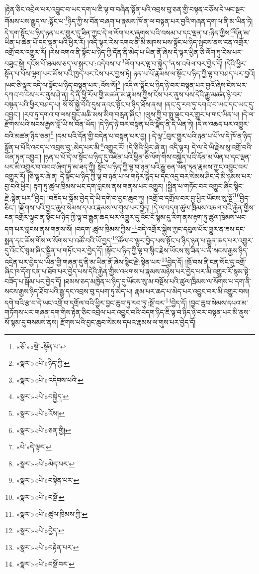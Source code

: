 །རྟེན་ཅིང་འབྲེལ་པར་འབྱུང་བ་ཡང་དག་པ་ཇི་ལྟ་བ་བཞིན་སྟོན་པའི་འབྲས་བུ་ཅན་གྱི་བསྟན་བཅོས་དེ་ཡང་སྔར་གོམས་པས་རྒྱུད་ལ་:སྟོང་པ་\footnote{«ཅོ་»«སྡེ་»སྟོན་པ་}ཉིད་ཀྱི་ས་བོན་བཞག་པ་རྣམས་ཁོ་ན་ལ་བསྟན་པར་བྱའི་གཞན་དག་ལ་ནི་མ་ཡིན་ཏེ། དེ་དག་སྟོང་པ་ཉིད་ཉན་པར་གྱུར་དུ་ཟིན་ཀྱང་དེ་ལ་ལོག་པར་ཞུགས་པའི་བསམ་པ་དང་ལྡན་པ་:ཉིད་ཀྱིས་\footnote{«སྣར་»«པེ་»ཉིད་ཀྱི་}དོན་མ་ཡིན་པ་ཆེན་པོ་དང་ལྡན་པའི་ཕྱིར་རོ། །འདི་ལྟར་རེས་འགའ་ནི་མི་མཁས་པས་སྟོང་པ་ཉིད་སྤངས་ནས་ངན་འགྲོར་འགྲོ་བར་འགྱུར་རོ། །རེས་འགའ་ནི་སྟོང་པ་ཉིད་ཀྱི་དོན་ནི་མེད་པ་ཡིན་ནོ་ཞེས་དེ་ལྟར་ཕྱིན་ཅི་ལོག་ཏུ་ངེས་པར་བཟུང་སྟེ། དངོས་པོ་ཐམས་ཅད་ལ་སྐུར་པ་:འདེབས་པ་\footnote{«སྣར་»«པེ་»འདེབས་པའི་}ལོག་པར་ལྟ་བ་སྐྱེད་\footnote{«སྣར་»«པེ་»བསྐྱེད་}ནས་འཕེལ་བར་བྱེད་དོ། །དེའི་ཕྱིར་སྟོན་པ་པོས་ལྷག་པར་མོས་པའི་ཁྱད་པར་ངེས་པར་བྱས་ཏེ། ཉན་པ་པོ་རྣམས་ལ་སྟོང་པ་ཉིད་ཀྱི་ལྟ་བ་བཤད་པར་བྱའོ། །ཡང་ཅི་ལྟར་འདི་ལ་སྟོང་པ་ཉིད་བསྟན་པར་:འོས་སོ།\footnote{«སྣར་»«པེ་»འོས།} །འདི་ལ་སྟོང་པ་ཉིད་ཉེ་བར་བསྟན་པར་བྱའོ་ཞེས་ངེས་པར་དཀའ་བ་ངེས་པར་ནུས་ཤེ་ན། དེ་ནི་ཕྱི་རོལ་གྱི་མཚན་མ་རྣམས་ཀྱིས་ངེས་པར་ནུས་པས་དེའི་རྒྱུ་མཚན་ཉེ་བར་བསྟན་པའི་ཕྱིར་བཤད་པ། སོ་སོ་སྐྱེ་བོའི་དུས་ནའང་སྟོང་པ་ཉིད་ཐོས་ནས། །ནང་དུ་རབ་ཏུ་དགའ་བ་ཡང་དང་ཡང་དུ་འབྱུང་། །རབ་ཏུ་དགའ་བ་ལས་བྱུང་མཆི་མས་མིག་བརླན་ཞིང་། །ལུས་ཀྱི་བ་སྤུ་ལྡང་བར་གྱུར་པ་གང་ཡིན་པ། །དེ་ལ་རྫོགས་པའི་སངས་རྒྱས་བློ་ཡི་ས་བོན་ཡོད། །དེ་ཉིད་ཉེ་བར་བསྟན་པའི་སྣོད་ནི་དེ་ཡིན་ཏེ། །དེ་ལ་འཆད་པར་འགྱུར་བའི་མཚན་ཉིད་ཅན།\footnote{«སྣར་»«པེ་»ཅན་གྱི།} །དམ་པའི་དོན་གྱི་བདེན་པ་བསྟན་པར་བྱ། །:དེ་ལྟ་\footnote{«པེ་»དེ་ལྟར་}བུར་གྱུར་པའི་ཉན་པ་པོ་ལ་དེ་ཁོ་ན་ཉིད་སྟོན་པ་པོའི་འབད་པ་འབྲས་བུ་:མེད་པར་མི་\footnote{«སྣར་»«པེ་»མེད་པར་}འགྱུར་རོ། །དེ་ཅིའི་ཕྱིར་ཞེ་ན། འདི་ལྟར། དེ་ལ་དེ་ཡི་རྗེས་སུ་འགྲོ་བའི་ཡོན་ཏན་འབྱུང་། །ཉན་པ་པོ་དེ་ལ་སྟོང་པ་ཉིད་དུ་འཛིན་པའི་ཕྱིན་ཅི་ལོག་གིས་བསྐྱེད་པའི་དོན་མ་ཡིན་པ་དང་ལྡན་པར་མི་འགྱུར་བ་འབའ་ཞིག་ཏུ་མ་ཟད་ཀྱི། སྟོང་པ་ཉིད་ཀྱི་ལྟ་བ་ཉན་པའི་རྒྱུ་ཅན་ཡོན་ཏན་རྣམས་ཀྱང་འབྱུང་བར་འགྱུར་རོ། །ཅི་ལྟར་ཞེ་ན། དེ་སྟོང་པ་ཉིད་ཀྱི་ལྟ་བ་ཉན་པ་ལ་གཏེར་རྙེད་པ་དང་འདྲ་བར་སེམས་ཤིང་དེ་མི་ཉམས་པར་བྱ་བའི་ཕྱིར། རྟག་ཏུ་ཚུལ་ཁྲིམས་ཡང་དག་བླངས་ནས་གནས་པར་འགྱུར། །སྦྱིན་པ་གཏོང་བར་འགྱུར་ཞིང་སྙིང་རྗེ་:སྟེན་པར་\footnote{«སྣར་»«པེ་»བསྟེན་པར་}བྱེད། །བཟོད་པ་སྒོམ་བྱེད་དེ་ཡི་དགེ་བ་བྱང་ཆུབ་ཏུ། །འགྲོ་བ་དགྲོལ་བར་བྱ་ཕྱིར་ཡོངས་སུ་སྔོ་\footnote{«སྣར་»«པེ་»བསྔོ་}བྱེད་ཅིང་། །རྫོགས་པའི་བྱང་ཆུབ་སེམས་དཔའ་རྣམས་ལ་གུས་པར་བྱེད། །དེ་ལ་བདག་ཚུལ་ཁྲིམས་འཆལ་བའི་རྐྱེན་གྱིས་ངན་འགྲོར་ལྟུང་ན་སྟོང་པ་ཉིད་ཀྱི་ལྟ་བ་རྒྱུན་ཆད་པར་འགྱུར་དུ་འོང་ངོ་སྙམ་དུ་རིག་ནས་རྟག་ཏུ་ཚུལ་ཁྲིམས་ཡང་དག་པར་བླངས་ནས་གནས་སོ། །བདག་:ཚུལ་ཁྲིམས་ཀྱིས་\footnote{«སྣར་»«པེ་»ཚུལ་ཁྲིམས་ཀྱི་}བདེ་འགྲོར་སྐྱེས་ཀྱང་དབུལ་པོར་གྱུར་ན་ཟས་དང་སྨན་དང་ཆོས་གོས་ལ་སོགས་པ་འཚོ་བའི་ཡོ་བྱད་\footnote{«སྣར་»«པེ་»བྱེད་}ཚོལ་བ་ལྷུར་བྱེད་པས་སྟོང་པ་ཉིད་ཉན་པ་རྒྱུན་ཆད་པར་འགྱུར་དུ་འོང་ངོ་སྙམ་ཞིང་སྦྱིན་པ་གཏོང་བར་བྱེད་དོ། །སྟོང་པ་ཉིད་ཀྱི་ལྟ་བ་སྙིང་རྗེས་ཡོངས་སུ་ཟིན་པ་ནི་སངས་རྒྱས་ཉིད་འདྲེན་པར་བྱེད་པ་ཡིན་གྱི་གཞན་དུ་ནི་མ་ཡིན་ནོ་ཞེས་སྙིང་རྗེ་:སྟེན་པར་\footnote{«སྣར་»«པེ་»བརྟེན་པར་}བྱེད་དོ། །ཁྲོ་བས་ནི་ངན་སོང་དུ་འགྲོ་ཞིང་ཁ་དོག་ངན་པ་ཐོབ་པར་བྱེད་པས་དེའི་རྐྱེན་གྱིས་འཕགས་པ་རྣམས་མཉེས་པར་བྱེད་པར་མི་འགྱུར་རོ་སྙམ་སྟེ་བཟོད་པ་སྒོམ་པར་བྱེད་དོ། །ཐམས་ཅད་མཁྱེན་པ་ཉིད་དུ་ཡོངས་སུ་མ་བསྔོས་པའི་ཚུལ་ཁྲིམས་ལ་སོགས་པ་དག་ནི་སངས་རྒྱས་ཉིད་ཐོབ་པའི་རྒྱུ་དང་འབྲས་བུ་དཔག་ཏུ་མེད་པ། རྣམ་པར་ཆད་པ་མེད་པར་འབྱུང་བར་མི་འགྱུར་བས། དགེ་བའི་རྩ་བ་དེ་ཡང་འགྲོ་བ་དགྲོལ་བའི་ཕྱིར་བྱང་ཆུབ་ཏུ་རབ་ཏུ་:སྔོ་བར་\footnote{«སྣར་»«པེ་»བསྔོ་བར་}བྱེད་དོ། །བྱང་ཆུབ་སེམས་དཔའ་མ་གཏོགས་པར་གཞན་དག་གིས་རྟེན་ཅིང་འབྲེལ་པར་འབྱུང་བའི་བདག་ཉིད་ཇི་ལྟ་བ་ཉིད་ཉེ་བར་བསྟན་པར་མི་ནུས་སོ་སྙམ་དུ་བསམས་ནས། རྫོགས་པའི་བྱང་ཆུབ་སེམས་དཔའ་རྣམས་ལ་གུས་པར་བྱེད་དོ། 